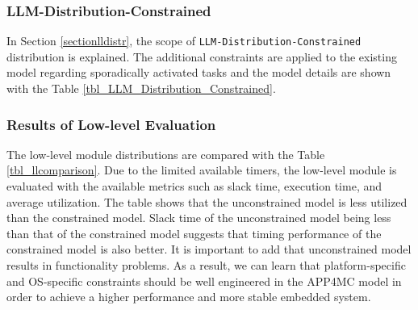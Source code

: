 \llmdistrUnconstrained

\subsubsection{LLM-Distribution-Constrained}
In Section \ref{sectionlldistr}, the scope of \texttt{LLM-Distribution-Constrained} distribution is explained. The additional constraints are applied to the existing model regarding sporadically activated tasks and the model details are shown with the Table \ref{tbl_LLM_Distribution_Constrained}. 

\llmdistrConstrained

\subsubsection{Results of Low-level Evaluation}
The low-level module distributions are compared with the Table \ref{tbl_llcomparison}. Due to the limited available timers, the low-level module is evaluated with the available metrics such as slack time, execution time, and average utilization. The table shows that the unconstrained model is less utilized than the constrained model. Slack time of the unconstrained model being less than that of the constrained model suggests that timing performance of the constrained model is also better. It is important to add that unconstrained model results in functionality problems. As a result, we can learn that platform-specific and OS-specific constraints should be well engineered in the APP4MC model in order to achieve a higher performance and more stable embedded system. 

\llcomparison




